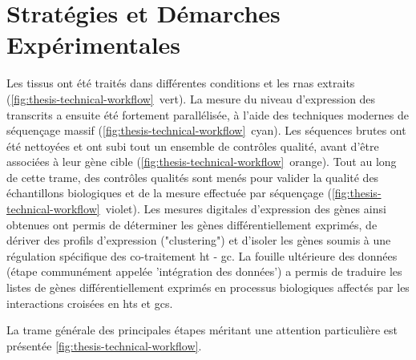 \documentclass[../main.tex]{subfiles}
\begin{document}
\chapter{Stratégies et Démarches Expérimentales}

Les tissus ont été traités dans différentes conditions et les \glspl{rna} extraits (\autoref{fig:thesis-technical-workflow}~vert).
La mesure du niveau d'expression des transcrits a ensuite été fortement parallélisée, à l'aide des techniques modernes de séquençage massif (\autoref{fig:thesis-technical-workflow}~cyan).
Les séquences brutes ont été nettoyées et ont subi tout un ensemble de contrôles qualité, avant d'être associées à leur gène cible (\autoref{fig:thesis-technical-workflow}~orange).
Tout au long de cette trame, des contrôles qualités sont menés pour valider la qualité des échantillons biologiques et de la mesure effectuée par séquençage (\autoref{fig:thesis-technical-workflow}~violet).
Les mesures digitales d'expression des gènes ainsi obtenues ont permis de déterminer les gènes différentiellement exprimés, de dériver des profils d'expression ("clustering") et d'isoler les gènes soumis à une régulation spécifique des co-traitement \gls{ht} - \gls{gc}.
La fouille ultérieure des données (étape communément appelée 'intégration des données') a permis de traduire les listes de gènes différentiellement exprimés en processus biologiques affectés par les interactions croisées en \glspl{ht} et \glspl{gc}. 


La trame générale des principales étapes méritant une attention particulière est présentée \autoref{fig:thesis-technical-workflow}.


\end{document}
